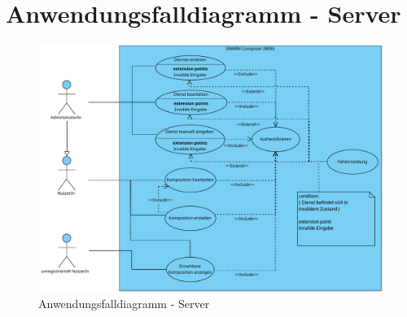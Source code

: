 \newpage


\section{Anwendungsfalldiagramm - Server}

\begin{figure}[h]
	\centering
	\includegraphics[width=\textwidth]{img/Produktfunktionen_web}
	\caption{Anwendungsfalldiagramm - Server}
	\label{fig:anwendungsfalldiagramm-server}
\end{figure}

\newpage

